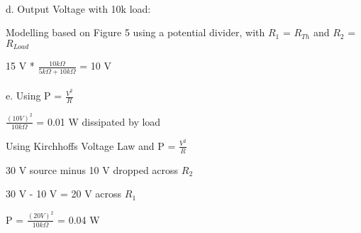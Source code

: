 \documentclass[a4paper, 12pt]{article}
\begin{document}
\paragraph{\newline}

d. Output Voltage with 10k load:\newline

Modelling based on Figure 5 using a potential divider, with $R_1$ = $R_{Th}$ and $R_2$ = $R_{Load}$\newline

15 V * $\frac{10k\Omega}{5k\Omega+10k\Omega}$ = 10 V\newline

\paragraph{\newline}

e. Using P = $\frac{V^2}{R}$\newline

$\frac{(10 V)^2}{10k\Omega}$ = 0.01 W dissipated by load\newline

Using Kirchhoffs Voltage Law and P = $\frac{V^2}{R}$

30 V source minus 10 V dropped across $R_2$

30 V - 10 V = 20 V across $R_1$

P = $\frac{(20 V)^2}{10k\Omega}$ = 0.04 W\newline
\end{document}
